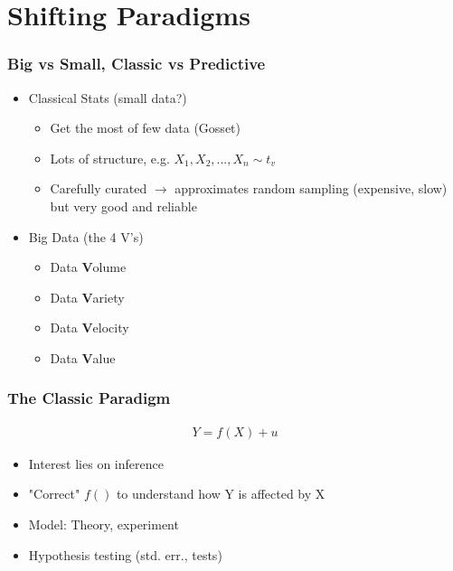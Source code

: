 \documentclass[
  shownotes,
  xcolor={svgnames},
  hyperref={colorlinks,citecolor=DarkBlue,linkcolor=DarkRed,urlcolor=DarkBlue}
  , aspectratio=169]{beamer}
\begin{document}
\section{Shifting Paradigms}
\begin{frame}
\frametitle{Big vs Small, Classic vs Predictive}

\begin{itemize}
  \item Classical Stats (small data?)
    \begin{itemize}
      \item Get the most of few data (Gosset)
      \item Lots of structure, e.g. $X_1,X_2,...,X_n\sim t_v$
      \item Carefully curated $\rightarrow$ approximates random sampling (expensive, slow) but very good and reliable
    \end{itemize}
\bigskip
    \item Big Data (the 4 V's) 
    \begin{itemize}
      \item Data {\bf V}olume
      \item Data {\bf V}ariety
      \item Data {\bf V}elocity
      \item Data {\bf V}alue
      
    \end{itemize}

\end{itemize}
\bigskip



\end{frame}
\begin{frame}
\frametitle{The Classic Paradigm}


\begin{align}
Y=f(X)+u
\end{align}
\medskip
\begin{itemize}
  \item Interest lies on inference
  \medskip
  \item "Correct" $f()$ to understand how Y is affected by X
  \medskip
  \item Model: Theory, experiment
  \medskip
  \item Hypothesis testing (std. err., tests)
\end{itemize}

\end{frame}
\end{document}
